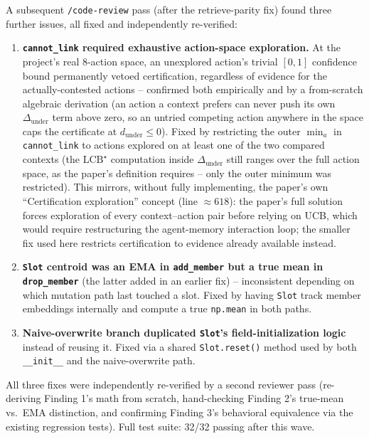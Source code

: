 \documentclass[11pt]{article}
\begin{document}
A subsequent \texttt{/code-review} pass (after the retrieve-parity fix)
found three further issues, all fixed and independently re-verified:

\begin{enumerate}
  \item \textbf{\texttt{cannot\_link} required exhaustive action-space
  exploration.} At the project's real 8-action space, an unexplored
  action's trivial $[0,1]$ confidence bound permanently vetoed
  certification, regardless of evidence for the actually-contested
  actions -- confirmed both empirically and by a from-scratch algebraic
  derivation (an action a context prefers can never push its own
  $\Delta_{\text{under}}$ term above zero, so an untried competing
  action anywhere in the space caps the certificate at
  $d_{\text{under}} \le 0$). Fixed by restricting the outer $\min_a$ in
  \texttt{cannot\_link} to actions explored on at least one of the two
  compared contexts (the $\mathrm{LCB}^\star$ computation inside
  $\Delta_{\text{under}}$ still ranges over the full action space, as
  the paper's definition requires -- only the outer minimum was
  restricted). This mirrors, without fully implementing, the paper's own
  ``Certification exploration'' concept (line $\approx 618$): the
  paper's full solution forces exploration of every context--action pair
  before relying on UCB, which would require restructuring the
  agent-memory interaction loop; the smaller fix used here restricts
  certification to evidence already available instead.
  \item \textbf{\texttt{Slot} centroid was an EMA in \texttt{add\_member}
  but a true mean in \texttt{drop\_member}} (the latter added in an
  earlier fix) -- inconsistent depending on which mutation path last
  touched a slot. Fixed by having \texttt{Slot} track member embeddings
  internally and compute a true \texttt{np.mean} in both paths.
  \item \textbf{Naive-overwrite branch duplicated \texttt{Slot}'s
  field-initialization logic} instead of reusing it. Fixed via a shared
  \texttt{Slot.reset()} method used by both \texttt{\_\_init\_\_} and the
  naive-overwrite path.
\end{enumerate}

All three fixes were independently re-verified by a second reviewer pass
(re-deriving Finding 1's math from scratch, hand-checking Finding 2's
true-mean vs.\ EMA distinction, and confirming Finding 3's behavioral
equivalence via the existing regression tests). Full test suite: 32/32
passing after this wave.
\end{document}
